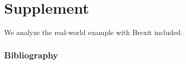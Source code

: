 \documentclass{beamer}
\theoremstyle{definition}
\begin{document}
\section{Supplement}
We analyze the real-world example with Brexit included.

\begin{frame}
    \frametitle{Bibliography}

\printbibliography
\end{frame}
\end{document}
